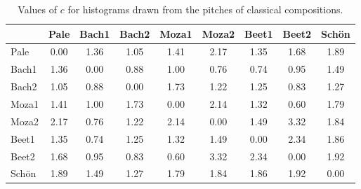 \begin{table}[h!]
\begin{center}
\begin{tabular}{| l | c | c | c | c | c | c | c | c |}\hline
 & Pale & Bach1 & Bach2 & Moza1 & Moza2 & Beet1 & Beet2 & Sch\"on \\\hline
Pale & 0.00  & 1.36  & 1.05  & 1.41  & 2.17  & 1.35  & 1.68  & 1.89 \\\hline
Bach1 & 1.36  & 0.00  & 0.88  & 1.00  & 0.76  & 0.74  & 0.95  & 1.49 \\\hline
Bach2 & 1.05  & 0.88  & 0.00  & 1.73  & 1.22  & 1.25  & 0.83  & 1.27 \\\hline
Moza1 & 1.41  & 1.00  & 1.73  & 0.00  & 2.14  & 1.32  & 0.60  & 1.79 \\\hline
Moza2 & 2.17  & 0.76  & 1.22  & 2.14  & 0.00  & 1.49  & 3.32  & 1.84 \\\hline
Beet1 & 1.35  & 0.74  & 1.25  & 1.32  & 1.49  & 0.00  & 2.34  & 1.86 \\\hline
Beet2 & 1.68  & 0.95  & 0.83  & 0.60  & 3.32  & 2.34  & 0.00  & 1.92 \\\hline
Sch\"on & 1.89  & 1.49  & 1.27  & 1.79  & 1.84  & 1.86  & 1.92  & 0.00 \\\hline
\end{tabular}
\caption{Values of $c$ for histograms drawn from the pitches of classical compositions.}
\end{center}
\end{table}